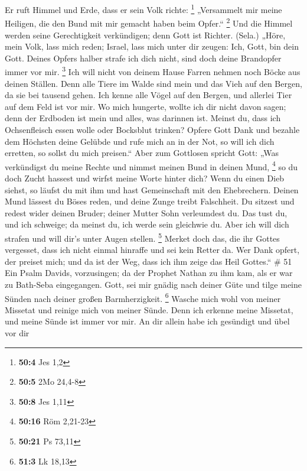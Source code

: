  Er ruft Himmel und Erde, dass er sein Volk richte:
\footnote{\textbf{50:4} Jes 1,2}  „Versammelt mir meine
Heiligen, die den Bund mit mir gemacht haben beim Opfer.`` \footnote{\textbf{50:5}
  2Mo 24,4-8}  Und die Himmel werden seine Gerechtigkeit
verkündigen; denn Gott ist Richter. (Sela.)  „Höre, mein
Volk, lass mich reden; Israel, lass mich unter dir zeugen: Ich, Gott,
bin dein Gott.  Deines Opfers halber strafe ich dich nicht,
sind doch deine Brandopfer immer vor mir. \footnote{\textbf{50:8} Jes
  1,11}  Ich will nicht von deinem Hause Farren nehmen noch
Böcke aus deinen Ställen.  Denn alle Tiere im Walde sind
mein und das Vieh auf den Bergen, da sie bei tausend gehen.
 Ich kenne alle Vögel auf den Bergen, und allerlei Tier auf
dem Feld ist vor mir.  Wo mich hungerte, wollte ich dir
nicht davon sagen; denn der Erdboden ist mein und alles, was darinnen
ist.  Meinst du, dass ich Ochsenfleisch essen wolle oder
Bocksblut trinken?  Opfere Gott Dank und bezahle dem
Höchsten deine Gelübde  und rufe mich an in der Not, so
will ich dich erretten, so sollst du mich preisen.``  Aber
zum Gottlosen spricht Gott: „Was verkündigst du meine Rechte und nimmst
meinen Bund in deinen Mund, \footnote{\textbf{50:16} Röm 2,21-23}
 so du doch Zucht hassest und wirfst meine Worte hinter
dich?  Wenn du einen Dieb siehst, so läufst du mit ihm und
hast Gemeinschaft mit den Ehebrechern.  Deinen Mund lässest
du Böses reden, und deine Zunge treibt Falschheit.  Du
sitzest und redest wider deinen Bruder; deiner Mutter Sohn verleumdest
du.  Das tust du, und ich schweige; da meinst du, ich werde
sein gleichwie du. Aber ich will dich strafen und will dir's unter Augen
stellen. \footnote{\textbf{50:21} Ps 73,11}  Merket doch
das, die ihr Gottes vergesset, dass ich nicht einmal hinraffe und sei
kein Retter da.  Wer Dank opfert, der preiset mich; und da
ist der Weg, dass ich ihm zeige das Heil Gottes.`` \# 51 
Ein Psalm Davids, vorzusingen;  da der Prophet Nathan zu ihm
kam, als er war zu Bath-Seba eingegangen.  Gott, sei mir
gnädig nach deiner Güte und tilge meine Sünden nach deiner großen
Barmherzigkeit. \footnote{\textbf{51:3} Lk 18,13}  Wasche
mich wohl von meiner Missetat und reinige mich von meiner Sünde.
 Denn ich erkenne meine Missetat, und meine Sünde ist immer
vor mir.  An dir allein habe ich gesündigt und übel vor dir
